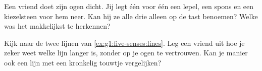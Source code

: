 \begin{exercise}[$\star$]\label{exo:g1:five-senses:8}
Een vriend doet zijn ogen dicht. Jij legt één voor één een lepel, een
spons en een kiezelsteen voor hem neer. Kan hij ze alle drie alleen
op de tast benoemen? Welke was het makkelijkst te herkennen?
\end{exercise}

\begin{exercise}[$\star\star$]\label{exo:g1:five-senses:9}
Kijk naar de twee lijnen van \cref{ex:g1:five-senses:lines}. Leg een
vriend uit hoe je zeker weet welke lijn langer is, zonder op je ogen
te vertrouwen. Kan je manier ook een lijn met een kronkelig touwtje
vergelijken?
\end{exercise}
